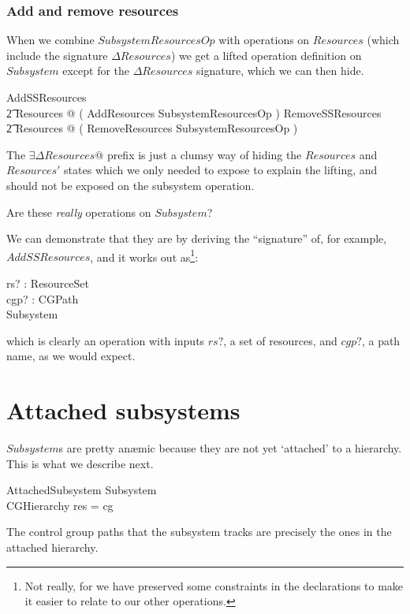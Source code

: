 \documentclass[a4paper,twoside,12pt]{article}
\begin{document}
\subsubsection{Add and remove resources}
When we combine $SubsystemResourcesOp$ with operations on $Resources$
(which include the signature $\Delta Resources$)
we get a lifted operation definition on $Subsystem$ except for the $\Delta Resources$ signature,
which we can then hide.

\begin{zed}
AddSSResources  \\
\t2 \exists \Delta Resources @ ( AddResources \land SubsystemResourcesOp )
\also
RemoveSSResources  \\
\t2 \exists \Delta Resources @ ( RemoveResources \land SubsystemResourcesOp )
\end{zed}
The $\exists \Delta Resources @$ prefix is just a clumsy way of hiding the $Resources$ and $Resources'$ states
which we only needed to expose to explain the lifting, and should not be exposed on the
subsystem operation.

Are these \emph{really} operations on $Subsystem$?

We can demonstrate that they are by deriving the ``signature'' of, for example, $AddSSResources$,
and it works out as\footnote{Not really,
for we have preserved some constraints in the declarations to make it easier to relate to our other operations.}:

\begin{schema*}
rs? : ResourceSet\\
cgp? : CGPath\\
\Delta Subsystem
\end{schema*}
which is clearly an operation with inputs $rs?$, a set of resources, and $cgp?$, a path name, as we would expect.

\section{Attached subsystems}
\label{sec:attss}

$Subsystem$s are pretty an\ae{}mic because they are not yet `attached' to a hierarchy. This is what we describe next.

\begin{schema}{AttachedSubsystem}
Subsystem \\
CGHierarchy
\where
\dom res = \dom cg
\end{schema}
The control group paths that the subsystem tracks are precisely the ones in
the attached hierarchy.
\end{document}
